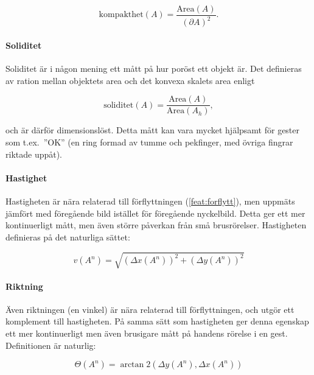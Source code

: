 \documentclass[../rapport_MVEX01-11-05]{subfiles}
\begin{document}
\begin{equation*}
  \textrm{kompakthet}(A) = \frac{\textrm{Area}(A)}{\left(\partial
  A\right)^2}.
\end{equation*}

\paragraph{Soliditet}
\label{feat:soliditet}

Soliditet är i någon mening ett mått på hur poröst ett objekt är. Det
definieras av ration mellan objektets area och det konvexa skalets
area enligt

\begin{equation*}
  \textrm{soliditet}(A) = \frac{\textrm{Area}(A)}{\textrm{Area}(A_h)},
\end{equation*}

och är därför dimensionslöst. Detta mått kan vara mycket hjälpsamt för
gester som t.ex.~''OK'' (en ring formad av tumme och pekfinger, med
övriga fingrar riktade uppåt).


\paragraph{Hastighet}
\label{feat:hastighet}

Hastigheten är nära relaterad till förflyttningen
(\ref{feat:forflytt}), men uppmäts jämfört med föregående bild
istället för föregående nyckelbild. Detta ger ett mer kontinuerligt
mått, men även större påverkan från små brusrörelser. Hastigheten
definieras på det naturliga sättet:

\begin{equation*}
  v(A^n) = \sqrt{\left(\Delta x(A^n) \right)^2
               + \left(\Delta y(A^n) \right)^2}
\end{equation*}

\paragraph{Riktning}
\label{feat:riktning}

Även riktningen (en vinkel) är nära relaterad till förflyttningen, och utgör ett
komplement till hastigheten. På samma sätt som hastigheten ger denna
egenskap ett mer kontinuerligt men även brusigare mått på handens
rörelse i en gest. Definitionen är naturlig:

\begin{equation*}
  \Theta(A^n) = \arctan\!2\left(
  \Delta y(A^n), \Delta x(A^n)\right)
\end{equation*}
\end{document}
